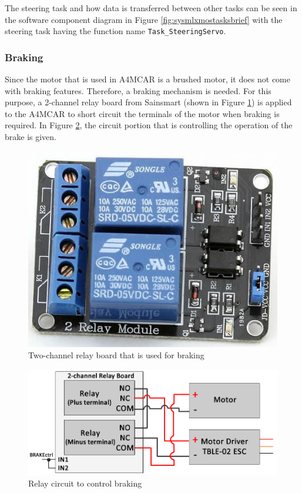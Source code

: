 The steering task and how data is transferred between other tasks can be seen in the software component diagram in Figure \ref{fig:sysmlxmostasksbrief} with the steering task having the function name \texttt{Task\texttt{\_}SteeringServo}.

\subsubsection{Braking}
Since the motor that is used in A4MCAR is a brushed motor, it does not come with braking features. Therefore, a braking mechanism is needed. For this purpose, a 2-channel relay board from Sainsmart (shown in Figure \ref{fig:relayboard}) is applied to the A4MCAR to short circuit the terminals of the motor when braking is required. In Figure \ref{fig:brake}, the circuit portion that is controlling the operation of the brake is given.
\begin{figure}[!ht]
	\centering
	\captionsetup{justification=centering}
	\includegraphics[scale=0.4]{content/images/relayboard.jpg}
	\caption{Two-channel relay board that is used for braking}
	\label{fig:relayboard}
\end{figure}

\begin{figure}[!ht]
	\centering
	\captionsetup{justification=centering}
	\includegraphics[scale=0.5]{content/images/brake.png}
	\caption{Relay circuit to control braking}
	\label{fig:brake}
\end{figure}

